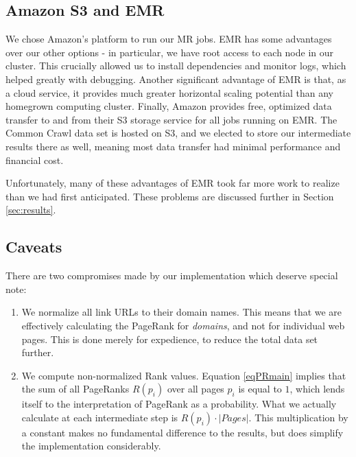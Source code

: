 \subsection{Amazon S3 and EMR}
We chose Amazon's  platform to run our MR jobs.
EMR has some advantages over our other options - in particular, we have root
access to each node in our cluster.  This crucially allowed us to install 
dependencies and monitor logs, which helped greatly with debugging.  Another
significant advantage of EMR is that, as a cloud service, it provides
much greater horizontal scaling potential than any homegrown computing cluster.
Finally, Amazon provides free, optimized data transfer to and from their S3 
storage service for all jobs running on EMR.  The Common Crawl data set is hosted
on S3, and we elected to store our intermediate results there as well, meaning
most data transfer had minimal performance and financial cost.

Unfortunately, many of these advantages of EMR took far more work to realize than
we had first anticipated.  These problems are discussed further in Section \ref{sec:results}.

\subsection{Caveats}
There are two compromises made by our implementation which deserve special note:

\begin{enumerate}
\item We normalize all link URLs to their domain names.  
    This means that we are effectively calculating the PageRank for \emph{domains}, 
    and not for individual web pages.  This is done merely for expedience, to
    reduce the total data set further.
\item We compute non-normalized Rank values.  Equation \eqref{eqPRmain}
    implies that the sum of all PageRanks $R(p_i)$ over all pages $p_i$ is
    equal to $1$, which lends itself to the interpretation of PageRank as a 
    probability.  What we actually calculate at each intermediate step is
    $R(p_i) \cdot |Pages|$.  This multiplication by a constant makes no 
    fundamental difference to the results, but does simplify the implementation
    considerably.
\end{enumerate}
